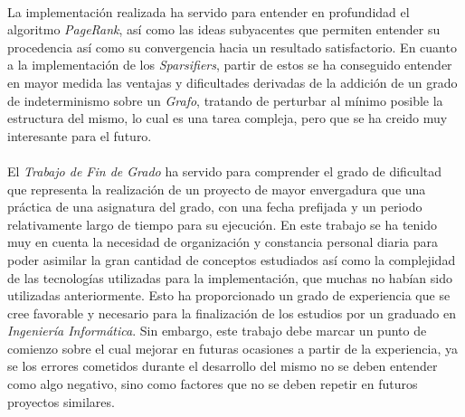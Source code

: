 \documentclass{subfiles}
\begin{document}
      \paragraph{}
      La implementación realizada ha servido para entender en profundidad el algoritmo \emph{PageRank}, así como las ideas subyacentes que permiten entender su procedencia así como su convergencia hacia un resultado satisfactorio. En cuanto a la implementación de los \emph{Sparsifiers}, partir de estos se ha conseguido entender en mayor medida las ventajas y dificultades derivadas de la addición de un grado de indeterminismo sobre un \emph{Grafo}, tratando de perturbar al mínimo posible la estructura del mismo, lo cual es una tarea compleja, pero que se ha creido muy interesante para el futuro.

      \paragraph{}
      El \emph{Trabajo de Fin de Grado} ha servido para comprender el grado de dificultad que representa la realización de un proyecto de mayor envergadura que una práctica de una asignatura del grado, con una fecha prefijada y un periodo relativamente largo de tiempo para su ejecución. En este trabajo se ha tenido muy en cuenta la necesidad de organización y constancia personal diaria para poder asimilar la gran cantidad de conceptos estudiados así como la complejidad de las tecnologías utilizadas para la implementación, que muchas no habían sido utilizadas anteriormente. Esto ha proporcionado un grado de experiencia que se cree favorable y necesario para la finalización de los estudios por un graduado en \emph{Ingeniería Informática}. Sin embargo, este trabajo debe marcar un punto de comienzo sobre el cual mejorar en futuras ocasiones a partir de la experiencia, ya se los errores cometidos durante el desarrollo del mismo no se deben entender como algo negativo, sino como factores que no se deben repetir en futuros proyectos similares.
\end{document}
